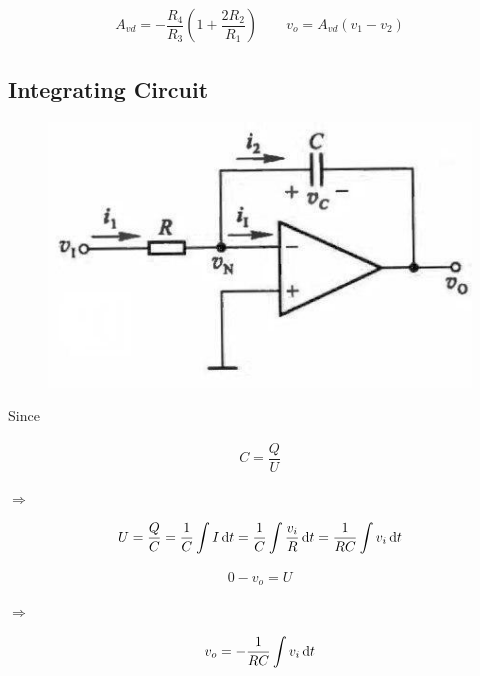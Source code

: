 \begin{equation*}
  \begin{aligned}
    A_{vd} = - \dfrac{R_4}{R_3} \left( 1 + \dfrac{2 R_2}{R_1}  \right) \quad\quad v_o = A_{vd} \left( v_1 - v_2 \right)
  \end{aligned}
\end{equation*}

\subsection{Integrating Circuit}

\begin{figure}[H]
  \centering
  \includegraphics[width=0.7\linewidth]{figures/integrating-circuit}
\end{figure}

Since

\begin{equation*}
  \begin{aligned}
    C = \dfrac{Q}{U}
  \end{aligned}
\end{equation*}

$\Rightarrow $

\begin{equation*}
  \begin{aligned}
    U = \dfrac{Q}{C} = \dfrac{1}{C} \int I \mathop{}\!\mathrm{d} t = \dfrac{1}{C} \int \dfrac{v_i}{R} \mathop{}\!\mathrm{d} t = \dfrac{1}{RC} \int v_i \mathop{}\!\mathrm{d} t
  \end{aligned}
\end{equation*}

\begin{equation*}
  \begin{aligned}
    0 - v_o = U
  \end{aligned}
\end{equation*}

$\Rightarrow$

\begin{equation*}
  \begin{aligned}
    v_o = - \dfrac{1}{RC} \int v_i \mathop{}\!\mathrm{d} t
  \end{aligned}
\end{equation*}

